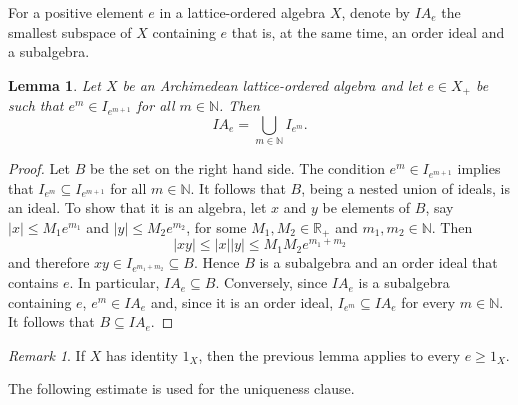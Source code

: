 \documentclass{amsart}
\theoremstyle{plain}
\newtheorem{lem}[thm]{Lemma}
\theoremstyle{definition}
\theoremstyle{remark}
\newtheorem*{rem}{Remark}
\newcommand\N{\ensuremath{\mathbb{N}}}
\newcommand\R{\ensuremath{\mathbb{R}}}
\begin{document}
For a positive element $e$ in a lattice-ordered algebra $X$,
denote by $IA_e$ the smallest subspace of $X$ containing $e$ that is,
at the same time, an order ideal and a subalgebra.

\begin{lem}\label{lem:prelim3}
    Let $X$ be an Archimedean lattice-ordered algebra and let $e \in X_+$ be such
    that $e^{m}\in I_{e^{m+1}}$ for all $m \in \N$. Then
    \[
    IA_e=\bigcup_{m \in \N} I_{e^{m}}.
    \]
\end{lem}
\begin{proof}
    Let $B$ be the set on the right hand side. The condition
    $e^{m}\in I_{e^{m+1}}$ implies that $I_{e^{m}}\subseteq
    I_{e^{m+1}}$ for all $m \in \N$. It follows that $B$, being a
    nested union of ideals, is an ideal.
    To show that it is an algebra, let $x$ and $y$ be elements of $B$, say $|x|\le
    M_1e^{m_1}$ and $|y|\le M_2e^{m_2}$, for some $M_1,M_2 \in \R_+$
    and $m_1,m_2 \in \N$. Then
    \[
    |xy|\le |x| |y|\le M_1M_2 e^{m_1+m_2}
    \]
    and therefore $xy \in I_{e^{m_1+m_2}}\subseteq B$. Hence $B$ is a
    subalgebra and an order ideal that contains $e$. In particular,
    $IA_e\subseteq B$. Conversely, since $IA_e$ is a subalgebra
    containing $e$, $e^{m}\in IA_e$ and, since it is an order ideal,
    $I_{e^{m}}\subseteq IA_e$ for every $m \in \N$. It follows that
    $B\subseteq IA_e$.
\end{proof}

\begin{rem}
    If $X$ has identity $1_X$, then the previous lemma applies to every
    $e\ge 1_X$.
\end{rem}

The following estimate is used for the uniqueness clause.
\end{document}
